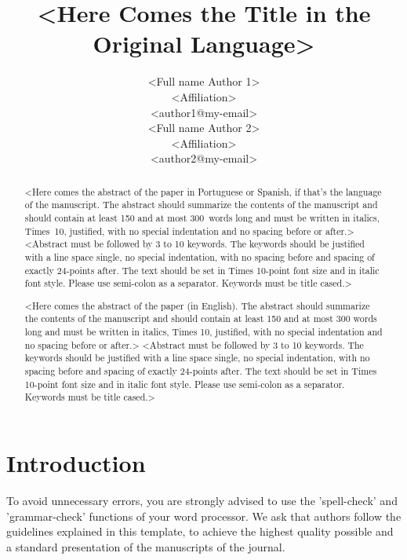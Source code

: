 \documentclass[english,brazilian]{RBIEarticle} %
\title{<Here Comes the Title in the Original Language>}
\author{%
	\parbox{8cm}{%
		<Full name Author 1>\\
		<Affiliation>\\
		<author1@my-email>
	}
	\parbox{8cm}{%
		<Full name Author 2>\\
		<Affiliation>\\
		<author2@my-email>
	}
}
\begin{document}
\maketitle

\begin{abstract}
<Here comes the abstract of the paper in Portuguese or Spanish, if that’s the language of the manuscript. The abstract should summarize the contents of the manuscript and should contain at least 150 and at most 300~words long and must be written in italics, Times~10, justified, with no special indentation and no spacing before or after.>
\keywords <Abstract must be followed by 3 to 10 keywords. The keywords should be justified with a line space single, no special indentation, with no spacing before and spacing of exactly 24-points after. The text should be set in Times 10-point font size and in italic font style. Please use semi-colon as a separator. Keywords must be title cased.>
\end{abstract}

\begin{otherlanguage}{english}
\begin{abstract}
<Here comes the abstract of the paper (in English). The abstract should summarize the contents of the manuscript and should contain at least 150 and at most 300 words long and must be written in italics, Times 10, justified, with no special indentation and no spacing before or after.>
\keywords <Abstract must be followed by 3 to 10 keywords. The keywords should be justified with a line space single, no special indentation, with no spacing before and spacing of exactly 24-points after. The text should be set in Times 10-point font size and in italic font style. Please use semi-colon as a separator. Keywords must be title cased.>
\end{abstract}
\end{otherlanguage}

\pagebreak


\section{Introduction}
To avoid unnecessary errors, you are strongly advised to use the 'spell-check' and 'grammar-check' functions of your word processor. We ask that authors follow the guidelines explained in this template, to achieve the highest quality possible and a standard presentation of the manuscripts of the journal.
\end{document}
